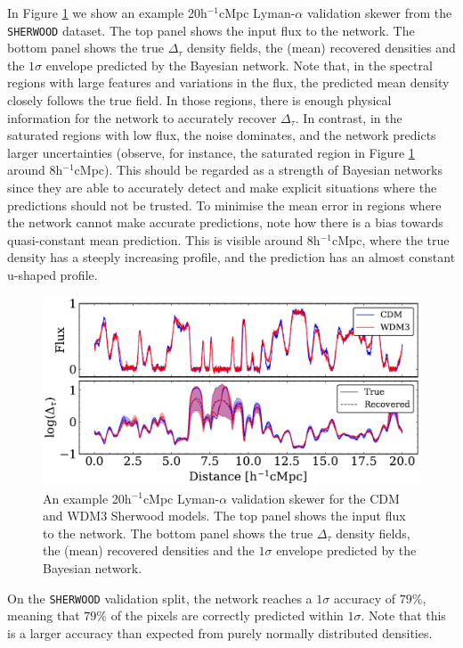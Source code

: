 In Figure \ref{fig: example_recovered_skewer} we show an example 20h$^{-1}$cMpc  Lyman-$\alpha$ validation skewer from the \texttt{SHERWOOD} dataset. The top panel shows the input flux to the network. The bottom panel shows the true $\Delta_\tau$ density fields, the (mean) recovered densities and the $1\sigma$ envelope predicted by the Bayesian network. Note that, in the spectral regions with large features and variations in the flux, the predicted mean density closely follows the true field. In those regions, there is enough physical information for the network to accurately recover $\Delta_\tau$. In contrast, in the saturated regions with low flux, the noise dominates, and the network predicts larger uncertainties (observe, for instance, the saturated region in Figure \ref{fig: example_recovered_skewer} around 8h$^{-1}$cMpc). This should be regarded as a strength of Bayesian networks since they are able to accurately detect and make explicit situations where the predictions should not be trusted. To minimise the mean error in regions where the network cannot make accurate predictions, note how there is a bias towards quasi-constant mean prediction. This is visible around 8h$^{-1}$cMpc, where the true density has a steeply increasing profile, and the prediction has an almost constant u-shaped profile.
\begin{figure}[h!]
    \centering
    \includegraphics[width=0.99\linewidth]{img/ML/skewer.pdf}
    \caption{An example 20h$^{-1}$cMpc Lyman-$\alpha$ validation skewer for the CDM and WDM3 Sherwood models. The top panel shows the input flux to the network. The bottom panel shows the true $\Delta_\tau$ density fields, the (mean) recovered densities and the $1\sigma$ envelope predicted by the Bayesian network.}
    \label{fig: example_recovered_skewer}
\end{figure}
On the \texttt{SHERWOOD} validation split, the network reaches a $1\sigma$ accuracy of $79\%$, meaning that $79\%$ of the pixels are correctly predicted within $1\sigma$. Note that this is a larger accuracy than expected from purely normally distributed densities.














